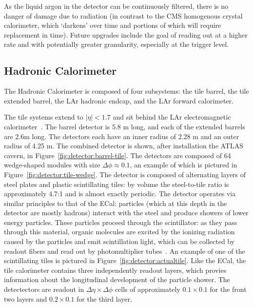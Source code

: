 As the liquid argon in the detector can be continuously filtered, there is no danger of damage due to radiation (in contrast to the CMS homogenous crystal calorimeter, which `darkens' over time and portions of which will require replacement in time). Future upgrades include the goal of reading out at a higher rate and with potentially greater granularity, especially at the trigger level.



\subsection{Hadronic Calorimeter}

The Hadronic Calorimeter is composed of four subsystems: the tile barrel, the tile extended barrel, the LAr hadronic endcap, and the LAr forward calorimeter. 

The tile systems extend to $|\eta| < 1.7$ and sit behind the LAr electromagnetic calorimeter~\cite{ATLASPaper,Tile}. The barrel detector is 5.8 m long, and each of the extended barrels are 2.6m long. The detectors each have an inner radius of 2.28 m and an outer radius of 4.25 m. The combined detector is shown, after installation the ATLAS cavern, in Figure~\ref{fig:detector:barrel-tile}. The detectors are composed of 64 wedge-shaped modules with size $\Delta\phi \approx 0.1$, an example of which is pictured in Figure~\ref{fig:detector:tile-wedge}. The detector is composed of alternating layers of steel plates and plastic scintillating tiles: by volume the steel-to-tile ratio is approximately 4.7:1 and is almost exactly periodic. The detector operates via similar principles to that of the ECal: particles (which at this depth in the detector are mostly hadrons) interact with the steel and produce showers of lower energy particles. These particles proceed through the scintillator: as they pass through this material, organic molecules are excited by the ionizing radiation caused by the particles and emit scintillation light, which can be collected by readout fibers and read out by photomultiplier tubes~\cite{Wigmans,Detectors,Tile}.  An example of one of the scintillating tiles is pictured in Figure~\ref{fig:detector:actualtile}. Like the ECal, the tile calorimeter contains three independently readout layers, which provies information about the longitudinal development of the particle shower. The detectectors are readout in $\Delta \eta \times \Delta\phi$ cells of approximately  $0.1 \times 0.1$ for the front two layers  and $0.2 \times 0.1$ for the third layer.

